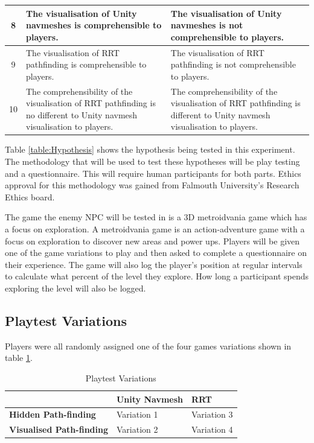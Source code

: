 \documentclass[journal]{IEEEtran}
\begin{document}
\begin{table}[h]
\begin{tabular}{|c|p{7.5cm}|p{7.5cm}|}
		8 &   The visualisation of  Unity navmeshes is comprehensible to players.
		&  The visualisation of  Unity navmeshes is not comprehensible to players.
		\\ \hline
		
		9 &  The visualisation of  RRT pathfinding is comprehensible to players.
		&  The visualisation of  RRT pathfinding is not comprehensible to players.
		\\ \hline
			
		10 &  The comprehensibility of  the visualisation of RRT pathfinding is no different to Unity navmesh visualisation to players.
		&  The comprehensibility of  the visualisation of RRT pathfinding is different to Unity navmesh visualisation to players.
		\\ \hline
	\end{tabular}
\end{table}
Table \ref{table:Hypothesis} shows the hypothesis being tested in this experiment. The methodology that will be used to test these hypotheses will be play testing and a questionnaire. This will require human participants for both parts. Ethics approval for this methodology was gained from Falmouth University’s Research Ethics board.

The game the enemy NPC will be tested in is a 3D metroidvania game which has a focus on exploration. A metroidvania game is an action-adventure game with a focus on exploration to discover new areas and power ups. Players will be given one of the game variations to play and then asked to complete a questionnaire on their experience. The game will also log the player's position at regular intervals to calculate what percent of the level they explore. How long a participant spends exploring the level will also be logged.

\subsection{Playtest Variations}
Players were all randomly assigned one of the four games variations shown in table \ref{table:PlaytestVariations}. 

\begin{table}[H]
	\centering
	\caption{Playtest Variations}
	\label{table:PlaytestVariations}
	\def\arraystretch{1.5}
	\begin{tabular}{ |l|l|l|}
		\hline
			  							& \textbf{Unity Navmesh}& \textbf{RRT} \\
		\hline
		\textbf{Hidden Path-finding}	& Variation 1			& Variation 3 \\
		\hline
		\textbf{Visualised Path-finding}& Variation 2		  	& Variation 4 \\
		\hline
	\end{tabular}
\end{table}
\end{document}
